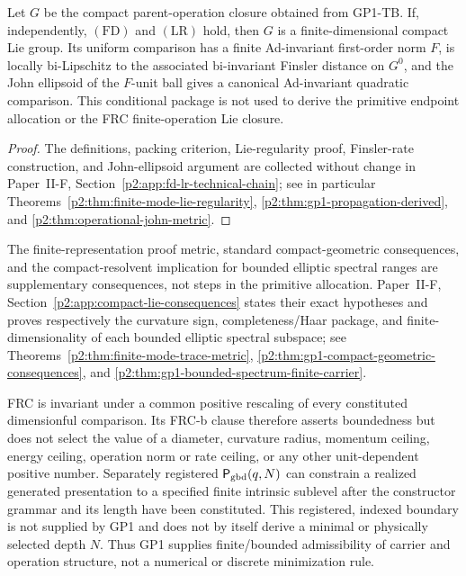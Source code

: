 \documentclass[12pt,a4paper]{article}
\begin{document}
\begin{theorem}
\label{p2:thm:fd-lr-regularity-summary}
Let \(G\) be the compact parent-operation closure obtained from GP1-TB.
If, independently, \((\mathrm{FD})\) and \((\mathrm{LR})\) hold, then
\(G\) is a finite-dimensional compact Lie group.  Its uniform comparison
has a finite Ad-invariant first-order norm \(F\), is locally bi-Lipschitz to
the associated bi-invariant Finsler distance on \(G^0\), and the John
ellipsoid of the \(F\)-unit ball gives a canonical Ad-invariant quadratic
comparison.  This conditional package is not used to derive the primitive
endpoint allocation or the FRC finite-operation Lie closure.
\end{theorem}

\begin{proof}
The definitions, packing criterion, Lie-regularity proof, Finsler-rate
construction, and John-ellipsoid argument are collected without change in
Paper~II-F, Section~\ref{p2:app:fd-lr-technical-chain}; see in particular
Theorems~\ref{p2:thm:finite-mode-lie-regularity},
\ref{p2:thm:gp1-propagation-derived}, and
\ref{p2:thm:operational-john-metric}.
\end{proof}

The finite-representation proof metric, standard compact-geometric
consequences, and the compact-resolvent implication for bounded elliptic
spectral ranges are supplementary consequences, not steps in the primitive
allocation.  Paper~II-F, Section~\ref{p2:app:compact-lie-consequences} states their exact
hypotheses and proves respectively the curvature sign, completeness/Haar
package, and finite-dimensionality of each bounded elliptic spectral subspace;
see Theorems~\ref{p2:thm:finite-mode-trace-metric},
\ref{p2:thm:gp1-compact-geometric-consequences}, and
\ref{p2:thm:gp1-bounded-spectrum-finite-carrier}.

\begin{corollary}
\label{p2:cor:gp1-boundedness-no-scale}
FRC is invariant under a common positive rescaling of every constituted
dimensionful comparison.  Its FRC-b clause therefore asserts boundedness but
does not select the value of a diameter, curvature radius, momentum ceiling,
energy ceiling, operation norm or rate ceiling, or any other unit-dependent
positive number.  Separately registered \(\mathsf P_{\rm gbd}(q,N)\)
can constrain a realized generated presentation to a specified finite intrinsic
sublevel after the constructor grammar and its length have been constituted.
This registered, indexed boundary is not supplied by GP1 and does not by
itself derive a minimal or physically selected depth \(N\).  Thus GP1
supplies finite/bounded admissibility of carrier and operation structure,
not a numerical or discrete minimization rule.
\end{corollary}
\end{document}
